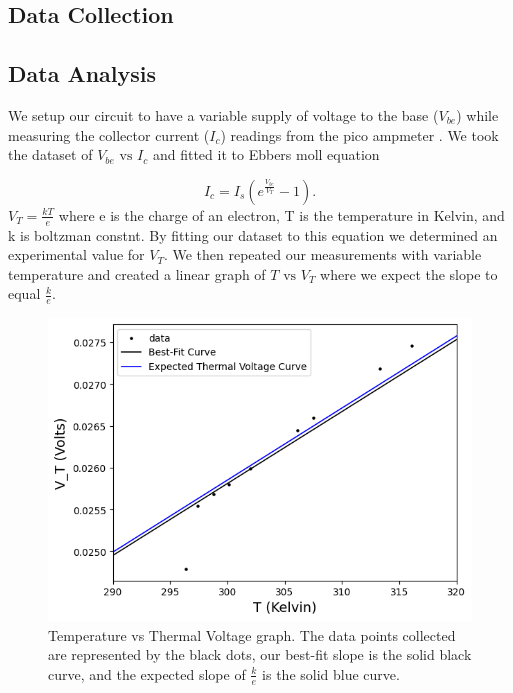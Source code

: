 \documentclass[12pt,letterpaper,twocolumn]{article}
\begin{document}

\subsection{Data Collection}





\subsection{Data Analysis}

We setup our circuit to have a variable supply of voltage to the base ($V_{be}$) while measuring the  collector current ($I_c$) readings from the pico ampmeter . We took the dataset of $V_{be} \text{ vs } I_c$ and fitted it to Ebbers moll equation

\begin{equation}
	I_c = I_s(e^{\frac{V_{be}}{V_T}}-1).
\end{equation}
$V_T = \frac{kT}{e}$ where e is the charge of an electron, T is the temperature in Kelvin, and k is boltzman constnt. By fitting our dataset to this equation we determined an experimental value for $V_T$. We then repeated our measurements with variable temperature and created a linear graph of $T \text{ vs } V_T$ where we expect the slope to equal $\frac{k}{e}$. 

\begin{figure}[h]
	\includegraphics[width = .5\textwidth]{2_6SiBoltz.png}
		\caption{Temperature vs Thermal Voltage graph. The data points collected are represented by the black dots, our best-fit slope is the solid black curve, and the expected slope of $\frac{k}{e}$ is the solid blue curve.}
	
\end{figure}
\end{document}
